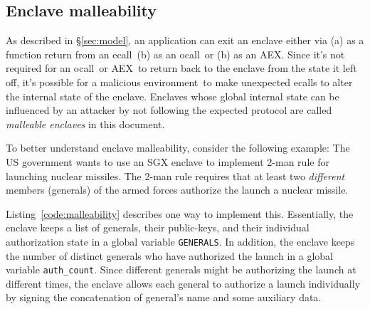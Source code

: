 \documentclass[letterpaper]{article}
\newcommand{\secref}[1]{\S\ref{#1}}
\newcommand{\ecall}{\textsf{ecall}}
\newcommand{\ocall}{\textsf{ocall}}
\newcommand{\aex}{\textsf{AEX}}
\newcommand{\env}{\textsf{environment}}
\begin{document}
  \subsection{Enclave malleability}
  \label{ssec:malleability}
  As described in \secref{sec:model}, an application can exit an
  enclave either via (a) as a function return from an \ecall\ (b) as
  an \ocall\ or (b) as an \aex. Since it's not required for an
  \ocall\ or \aex\ to return back to the enclave from the state it
  left off, it's possible for a malicious \env\ to make unexpected
  \ecall s to alter the internal state of the enclave. Enclaves whose
  global internal state can be influenced by an attacker by not
  following the expected protocol are called \textit{malleable
    enclaves} in this document.

  To better understand enclave malleability, consider the following
  example: The US government wants to use an SGX enclave to implement
  2-man rule for launching nuclear missiles. The 2-man rule requires
  that at least two \textit{different} members (generals) of the armed
  forces authorize the launch a nuclear missile.

  Listing~\ref{code:malleability} describes one way to implement this.
  Essentially, the enclave keeps a list of generals, their
  public-keys, and their individual authorization state in a global
  variable \texttt{GENERALS}. In addition, the enclave keeps the
  number of distinct generals who have authorized the launch in a
  global variable \texttt{auth\_count}. Since different generals might
  be authorizing the launch at different times, the enclave allows
  each general to authorize a launch individually by signing the
  concatenation of general's name and some auxiliary data.
\end{document}

